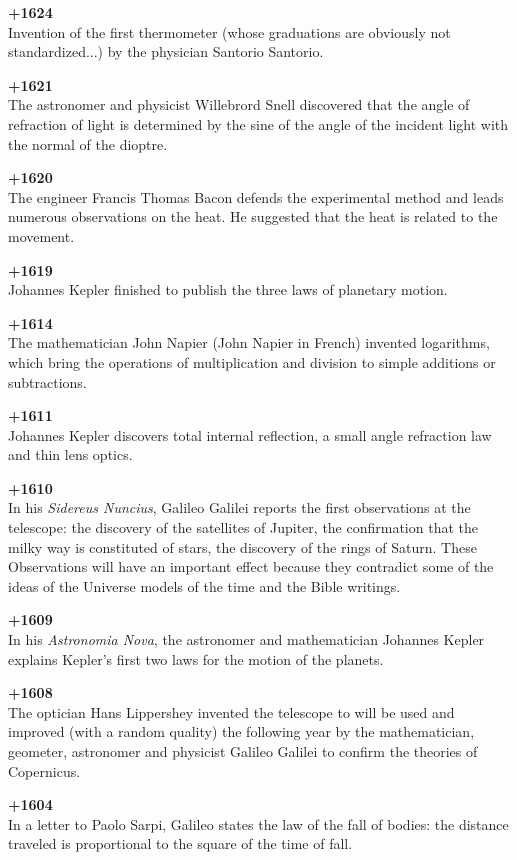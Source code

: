 \textbf{+1624}\\
Invention of the first thermometer (whose graduations are obviously not standardized...) by the physician Santorio Santorio.

\textbf{+1621}\\
The astronomer and physicist Willebrord Snell discovered that the angle of refraction of light is determined by the sine of the angle of the incident light with the normal of the dioptre.

\textbf{+1620}\\
The engineer Francis Thomas Bacon defends the experimental method and leads numerous observations on the heat. He suggested that the heat is related to the movement.

\textbf{+1619}\\
Johannes Kepler finished to publish the three laws of planetary motion.

\textbf{+1614}\\
The mathematician John Napier (John Napier in French) invented logarithms, which bring the operations of multiplication and division to simple additions or subtractions.

\textbf{+1611}\\
Johannes Kepler discovers total internal reflection, a small angle refraction law and thin lens optics.

\textbf{+1610}\\ In his \textit{Sidereus Nuncius}, Galileo Galilei reports the first observations at the telescope: the discovery of the satellites of Jupiter, the confirmation that the milky way is constituted of stars, the discovery of the rings of Saturn. These
Observations will have an important effect because they contradict some of the ideas of the Universe models of the time and the Bible writings.

\textbf{+1609}\\
In his \textit{Astronomia Nova}, the astronomer and mathematician Johannes Kepler explains Kepler's first two laws for the motion of the planets.

\textbf{+1608}\\
The optician Hans Lippershey invented the telescope to will be used and improved (with a random quality) the following year by the mathematician, geometer, astronomer and physicist Galileo Galilei to confirm the theories of Copernicus.

\textbf{+1604}\\
In a letter to Paolo Sarpi, Galileo states the law of the fall of bodies: the distance traveled is proportional to the square of the time of fall.

